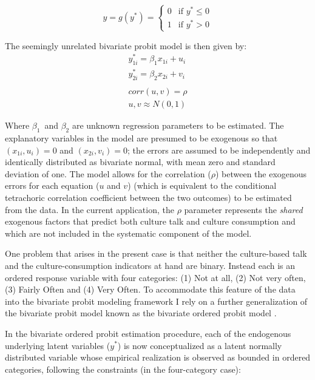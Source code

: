 \documentclass[11pt]{article}
\begin{document}
\begin{equation}
y=g(y^{*})=\left\{
        \begin{array}{rl}
                0 &\mbox{if $y^{*} \leq 0$} \\
                1 &\mbox{if $y^{*} > 0$} 
        \end{array} \right.
        \label{eq1}
\end{equation}

The seemingly unrelated bivariate probit model is then given by:
\begin{equation}
        \begin{array}{rl}
                y^{*}_{1i}=\beta_{1} x_{1i}+u_{i} \\
                y^{*}_{2i}=\beta_{2} x_{2i}+v_{i} \\ \\
                corr(u,v)=\rho \\
                u,v \approx N(0,1) 
        \end{array}
        \label{eq2}
\end{equation}

Where $\beta_{1}$\ and $\beta_{2}$ are unknown regression parameters to be estimated.  The explanatory variables in the model are presumed to be exogenous so that $(x_{1i},u_{i})=0$ and $(x_{2i},v_{i})=0$;  the errors are assumed to be independently and identically distributed as bivariate normal, with mean zero and standard deviation of one. The model allows for the correlation ($\rho$) between the exogenous errors for each equation ($u$ and $v$) (which is equivalent to the conditional tetrachoric correlation coefficient between the two outcomes) to be estimated from the data. In the current application, the $\rho$ parameter represents the \emph{shared} exogenous factors that predict both culture talk and culture consumption and which are not included in the systematic component of the model. 

One problem that arises in the present case is that neither the culture-based talk and the culture-consumption indicators at hand are binary. Instead each is an ordered response variable with four categories: (1) Not at all, (2) Not very often, (3) Fairly Often and (4) Very Often. To accommodate this feature of the data into the bivariate probit modeling framework I rely on a further generalization of the bivariate probit model known as the bivariate ordered probit model \citep{calhoun89}.  

 In the bivariate ordered probit estimation procedure, each of the endogenous underlying latent variables ($y^{*}$) is now conceptualized as a latent normally distributed variable whose empirical realization is observed as bounded in ordered categories, following the constraints (in the four-category case):
\end{document}
